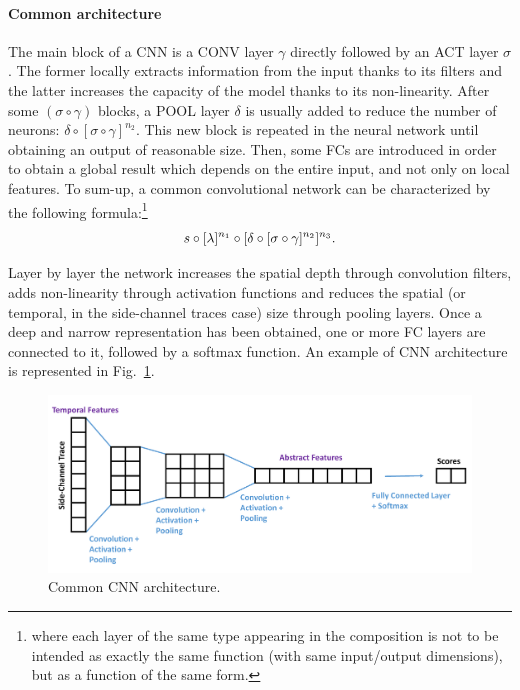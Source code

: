 \paragraph*{Common architecture}
The main block of a CNN is a CONV layer $\gamma$ directly followed by an ACT layer $\sigma$. The former locally extracts information from the input thanks to its filters and the latter increases the capacity of the model thanks to its non-linearity. After some $ ( \sigma \circ \gamma)$  blocks, a POOL layer $\delta$ is usually added to reduce the number of neurons: $\delta \circ [ \sigma\circ \gamma]^{n_2} $. This new block is repeated in the neural network until obtaining an output of reasonable size. Then, some FCs are introduced in order to obtain a global result which depends on the entire input, and not only on local features. To sum-up, a common convolutional network can be characterized by the following formula:\footnote{where each layer of the same type appearing in the composition is not to be intended as exactly the same function (\eg with same input/output dimensions), but as a function of the same form.} 
\begin{equation}\label{equ:CCN}
  s \circ [\lambda]^{n_1} \circ[\delta \circ [\sigma \circ \gamma  ]^{n_2} ]^{n_3}  .
\end{equation}

 Layer by layer the network increases the spatial depth through convolution filters, adds non-linearity through activation functions and reduces the spatial (or temporal, in the side-channel traces case) size through pooling layers. Once a deep and narrow representation has been obtained, one or more FC layers are connected to it, followed by a softmax function. An example of CNN architecture is represented in Fig.~\ref{fig:archi_conv}. 
\begin{figure}[h]
\centering
\includegraphics[width=\textwidth]{../Figures/CHES2017/convnet_arch.pdf}
\caption{Common CNN architecture.}
\label{fig:archi_conv}
\end{figure} 



